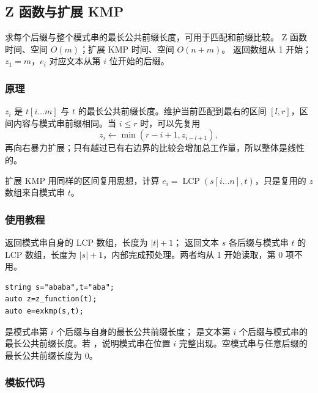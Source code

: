\subsection{Z 函数与扩展 KMP}
\label{algo:exkmp}
\AlgorithmInfo
    {求每个后缀与整个模式串的最长公共前缀长度，可用于匹配和前缀比较。}
    {Z 函数时间、空间 $O(m)$；扩展 KMP 时间、空间 $O(n+m)$。}
    {返回数组从 1 开始；$z_1=m$，$e_i$ 对应文本从第 $i$ 位开始的后缀。}

\subsubsection*{原理}
$z_i$ 是 $t[i\ldots m]$ 与 $t$ 的最长公共前缀长度。维护当前匹配到最右的区间 $[l,r]$，区间内容与模式串前缀相同。当 $i\leq r$ 时，可以先复用
\[
    z_i\gets\min(r-i+1,z_{i-l+1}),
\]
再向右暴力扩展；只有越过已有右边界的比较会增加总工作量，所以整体是线性的。

扩展 KMP 用同样的区间复用思想，计算 $e_i=\operatorname{LCP}(s[i\ldots n],t)$，只是复用的 $z$ 数组来自模式串 $t$。

\subsubsection*{使用教程}
 返回模式串自身的 LCP 数组，长度为 $|t|+1$； 返回文本 $s$ 各后缀与模式串 $t$ 的 LCP 数组，长度为 $|s|+1$，内部完成预处理。两者均从 1 开始读取，第 0 项不用。
\begin{lstlisting}[style=mtycpp,numbers=none]
string s="ababa",t="aba";
auto z=z_function(t);
auto e=exkmp(s,t);
\end{lstlisting}
 是模式串第 $i$ 个后缀与自身的最长公共前缀长度； 是文本第 $i$ 个后缀与模式串的最长公共前缀长度。若 ，说明模式串在位置 $i$ 完整出现。空模式串与任意后缀的最长公共前缀长度为 $0$。

\subsubsection*{模板代码}
